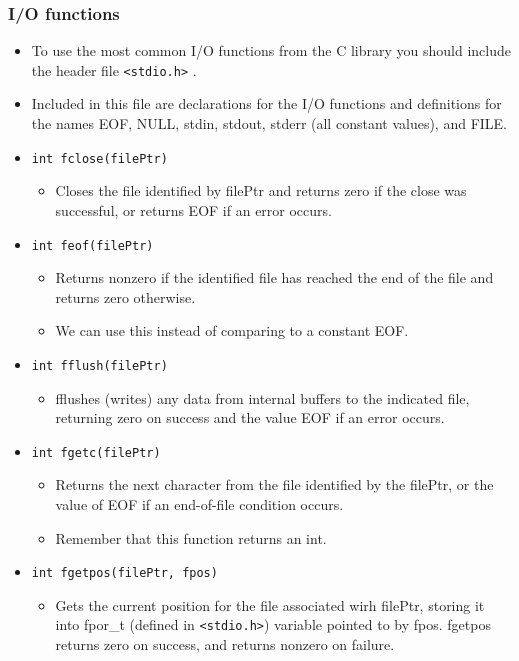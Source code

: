 \subsubsection{I/O functions}
\begin{itemize}
    \item To use the most common I/O functions from the C library you should include the header file \verb|<stdio.h>| .
    \item Included in this file are declarations for the I/O functions and definitions for the names EOF, NULL, stdin, stdout, stderr (all constant values), and FILE.
    \item \texttt{int fclose(filePtr)}
        \begin{itemize}
            \item Closes the file identified by filePtr and returns zero if the close was successful, or returns EOF if an error occurs.
        \end{itemize}
    
    \item \texttt{int feof(filePtr)}
        \begin{itemize}
            \item Returns nonzero if the identified file has reached the end of the file and returns zero otherwise.
            \item We can use this instead of comparing to a constant EOF.
        \end{itemize}
    
    \item \texttt{int fflush(filePtr)}
        \begin{itemize}
            \item fflushes (writes) any data from internal buffers to the indicated file, returning zero on success and the value EOF if an error occurs.
        \end{itemize}
    
    \item \texttt{int fgetc(filePtr)}
        \begin{itemize}
            \item Returns the next character from the file identified by the filePtr, or the value of EOF if an end-of-file condition occurs.
            \item Remember that this function returns an int. 
        \end{itemize}
    
    \item \texttt{int fgetpos(filePtr, fpos)}
        \begin{itemize}
            \item Gets the current position for the file associated wirh filePtr, storing it into fpor\_t (defined in \verb|<stdio.h>|) variable pointed to by fpos. fgetpos returns zero on success, and returns nonzero on failure.
        \end{itemize}
    

\end{itemize}
